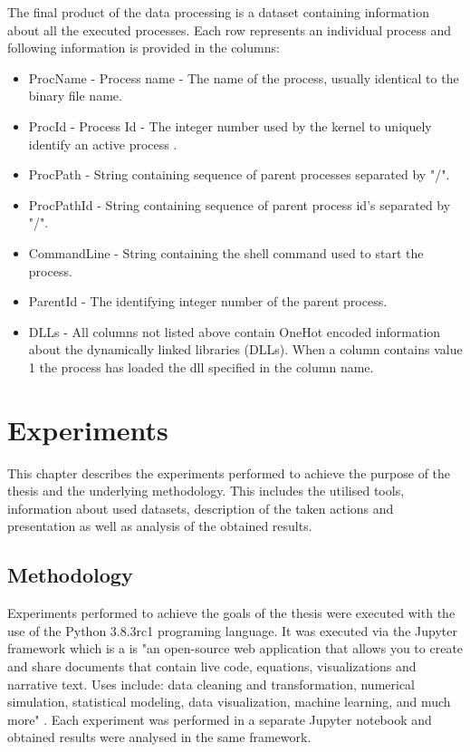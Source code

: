 \documentclass[a4paper,twoside,12pt]{book}
\begin{document}
The final product of the data processing is a dataset containing information about all the 
executed processes. Each row represents an individual process and following information is 
provided in the columns:
\begin{itemize}
	\item ProcName - Process name - The name of the process, usually identical to the binary 
	file name. 
	\item ProcId - Process Id - The integer number used by the kernel to uniquely identify 
	an active process \cite{bib:MicrosoftWinInternals}.
	\item ProcPath - String containing sequence of parent processes separated by "/".
	\item ProcPathId - String containing sequence of parent process id's separated by "/".
	\item CommandLine - String containing the shell command used to start the process.
	\item ParentId - The identifying integer number of the parent process. 
	\item DLLs - All columns not listed above contain OneHot encoded information about the 
	dynamically linked libraries (DLLs). When a column contains value 1 the process has 
	loaded the dll specified in the column name.
\end{itemize}

\chapter{Experiments}


This chapter describes the experiments performed to achieve the purpose of the thesis
and the underlying methodology. This includes the utilised tools, information about used datasets,
description of the taken actions and presentation as well as analysis of the obtained results.


\section{Methodology}

Experiments performed to achieve the goals of the thesis were executed with the use of 
the Python 3.8.3rc1 programing language. It was executed via the Jupyter framework which is
a is "an open-source web application that allows you to create and share documents that 
contain live code, equations, visualizations and narrative text. Uses include: data cleaning 
and transformation, numerical simulation, statistical modeling, data visualization, machine 
learning, and much more" \cite{bib:jupyter}. Each experiment was performed in a separate
Jupyter notebook and obtained results were analysed in the same framework. 
\end{document}
